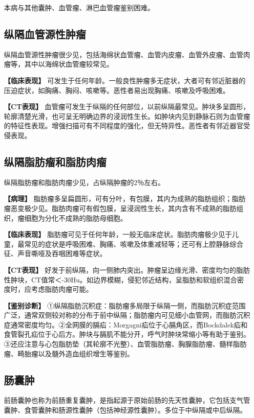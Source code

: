 本病与其他囊肿、血管瘤、淋巴血管瘤鉴别困难。

\subsection{纵隔血管源性肿瘤}

纵隔血管源性肿瘤很少见，包括海绵状血管瘤、血管内皮瘤、血管外皮瘤、血管肉瘤等，其中以海绵状血管瘤较常见。

\textbf{【临床表现】}
可发生于任何年龄。一般良性肿瘤多无症状，大者可有邻近脏器的压迫症状，如胸痛、胸闷、咳嗽等。恶性者易出现胸痛、咳嗽及呼吸困难。

\textbf{【CT表现】}
血管瘤可发生于纵隔的任何部位，以前纵隔最常见。肿块多呈圆形，轮廓清楚光滑，也可呈无明确边界的浸润性生长。如肿块内见到静脉石则为血管瘤的特征性表现。增强扫描可有不同程度的强化，但无特异性。恶性者有邻近器官受侵表现。

\subsection{纵隔脂肪瘤和脂肪肉瘤}

纵隔脂肪瘤和脂肪肉瘤少见，占纵隔肿瘤的2％左右。

\textbf{【病理】}
脂肪瘤多呈扁圆形，可有分叶，有包膜，其内为成熟的脂肪组织；脂肪瘤恶变极少见。脂肪肉瘤可有假包膜，呈浸润性生长，其内含有不成熟的脂肪组织，瘤细胞为分化不成熟的脂肪母细胞。

\textbf{【临床表现】}
脂肪瘤可见于任何年龄，一般无临床症状。脂肪肉瘤极少见于儿童，最常见的症状是呼吸困难、胸痛、咳嗽及体重减轻等；还可有上腔静脉综合征、声音嘶哑及吞咽困难等症状。

\textbf{【CT表现】}
好发于前纵隔，向一侧肺内突出。肿瘤呈边缘光滑、密度均匀的脂肪性肿块，CT值常＜-30Hu。如边界模糊，侵犯邻近结构，呈脂肪和软组织混合密度时，应考虑脂肪肉瘤可能。

\textbf{【鉴别诊断】}
①纵隔脂肪沉积症：脂肪瘤多局限于纵隔一侧，而脂肪沉积症范围广泛，通常双侧较对称的分布于前中纵隔；脂肪瘤内可见细小血管网，而脂肪沉积症通常密度均匀。②全网膜的膈疝：Morgagni疝位于心膈角区，而Bockdalek疝和食管裂孔疝位于心后方。肿块与膈肌不能分开，呼气时肿块常缩小等有助于鉴别。③还应注意与心包脂肪垫（其轮廓不光整）、血管脂肪瘤、胸腺脂肪瘤、髓样脂肪瘤、畸胎瘤以及髓外造血组织增生等鉴别。

\subsection{肠囊肿}

前肠囊肿也称为前肠重复囊肿，是指起源于原始前肠的先天性囊肿，它包括支气管囊肿、食管囊肿和肠源性囊肿（包括神经源性囊肿）。多位于中纵隔或中后纵隔。

